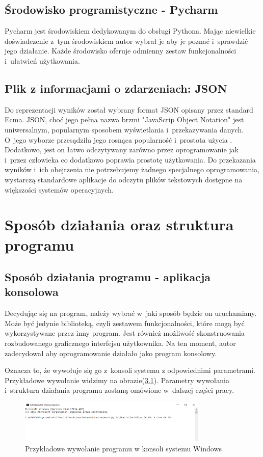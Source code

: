 \documentclass[eng,printmode]{mgr}
\begin{document}
\section{Środowisko programistyczne - Pycharm}
Pycharm jest środowiskiem dedykowanym do obsługi Pythona. Mając niewielkie doświadczenie z~tym środowiskiem autor wybrał je aby je poznać i~sprawdzić jego działanie. Każde środowisko oferuje odmienny zestaw funkcjonalności i~ułatwień użytkowania.

\section{Plik z informacjami o zdarzeniach: JSON}
Do reprezentacji wyników został wybrany format JSON opisany przez standard Ecma\newline\cite{JSON}. JSON, choć jego pełna nazwa brzmi "JavaScrip Object Notation" jest uniwersalnym, popularnym sposobem wyświetlania i~przekazywania danych. O~jego wyborze przesądziła jego rosnąca popularność i~prostota użycia \cite{JSON_popular}. Dodatkowo, jest on łatwo odczytywany zarówno przez oprogramowanie jak i~przez człowieka co dodatkowo poprawia prostotę użytkowania. Do przekazania wyników i~ich obejrzenia nie potrzebujemy żadnego specjalnego oprogramowania, wystarczą standardowe aplikacje do odczytu plików tekstowych dostępne na większości systemów operacyjnych.
\chapter{Sposób działania oraz struktura programu} \label{struktura_dzialanie}
\section{Sposób działania programu - aplikacja konsolowa}\label{sposób}
Decydując się na program, należy wybrać w~jaki sposób będzie on uruchamiany. Może być jedynie biblioteką, czyli zestawem funkcjonalności, które mogą być wykorzystywane przez inny program. Jest również możliwość skonstruowania rozbudowanego graficznego interfejsu użytkownika. Na ten moment, autor zadecydował aby oprogramowanie działało jako program konsolowy. 

Oznacza to, że wywołuje się go z~konsoli systemu z odpowiednimi parametrami. Przykładowe wywołanie widzimy na obrazie(\ref{wywolanie}). Parametry wywołania i~struktura działania programu zostaną omówione w~dalszej części pracy.
\begin{figure}[hbtp]
\label{wywolanie}
\caption{Przykładowe wywołanie programu w konsoli systemu Windows}
\centering
\includegraphics[width=0.8\textwidth]{cmd_wywolanie.PNG}
\end{figure}
\end{document}
